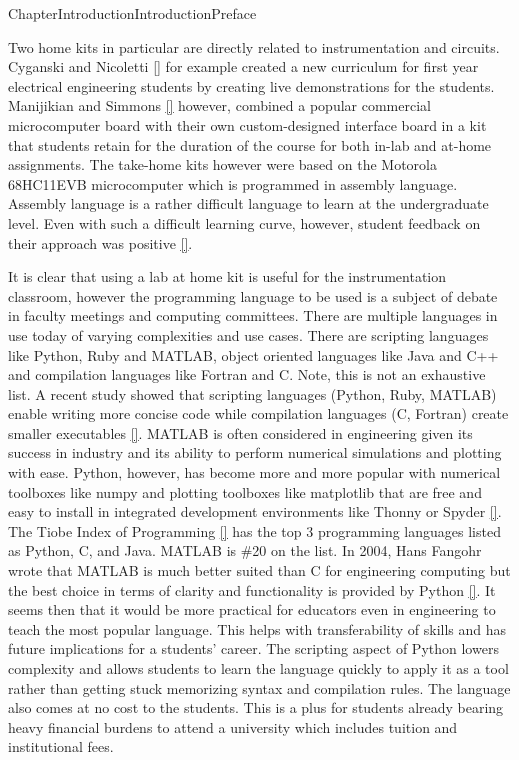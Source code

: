 \documentclass[oneside,10pt,]{book}
\newcommand{\xreffont}{\relax}
\newcommand{\linkhilite}[1]{\underline{#1}}
\numberwithin{equation}{section}
\begin{document}
\begin{chapterptx}{Chapter}{Introduction}{}{Introduction}{}{}{Preface}
\begin{introduction}{}
\par
Two home kits in particular are directly related to instrumentation and circuits. Cyganski and Nicoletti \hyperlink{LabAtHome4-EE}{\linkhilite{[{\xreffont 25}]}} for example created a new curriculum for first year electrical engineering students by creating live demonstrations for the students. Manijikian and Simmons \hyperlink{LabAtHome2-EE}{\linkhilite{[{\xreffont 23}]}} however, combined a popular commercial microcomputer board with their own custom-designed interface board in a kit that students retain for the duration of the course for both in-lab and at-home assignments. The take-home kits however were based on the Motorola 68HC11EVB microcomputer which is programmed in assembly language. Assembly language is a rather difficult language to learn at the undergraduate level. Even with such a difficult learning curve, however, student feedback on their approach was positive \hyperlink{LabAtHome2-EE}{\linkhilite{[{\xreffont 23}]}}.%
\par
It is clear that using a lab at home kit is useful for the instrumentation classroom, however the programming language to be used is a subject of debate in faculty meetings and computing committees. There are multiple languages in use today of varying complexities and use cases. There are scripting languages like Python, Ruby and MATLAB, object oriented languages like Java and C++ and compilation languages like Fortran and C. Note, this is not an exhaustive list. A recent study showed that scripting languages (Python, Ruby, MATLAB) enable writing more concise code while compilation languages (C, Fortran) create smaller executables \hyperlink{codetype}{\linkhilite{[{\xreffont 26}]}}. MATLAB is often considered in engineering given its success in industry and its ability to perform numerical simulations and plotting with ease. Python, however, has become more and more popular with numerical toolboxes like numpy and plotting toolboxes like matplotlib that are free and easy to install in integrated development environments like Thonny or Spyder \hyperlink{IDE}{\linkhilite{[{\xreffont 27}]}}. The Tiobe Index of Programming \hyperlink{Tiobe}{\linkhilite{[{\xreffont 28}]}} has the top 3 programming languages listed as Python, C, and Java. MATLAB is \#20 on the list. In 2004, Hans Fangohr wrote that MATLAB is much better suited than C for engineering computing but the best choice in terms of clarity and functionality is provided by Python \hyperlink{CodeComparison}{\linkhilite{[{\xreffont 29}]}}. It seems then that it would be more practical for educators even in engineering to teach the most popular language. This helps with transferability of skills and has future implications for a students' career. The scripting aspect of Python lowers complexity and allows students to learn the language quickly to apply it as a tool rather than getting stuck memorizing syntax and compilation rules. The language also comes at no cost to the students. This is a plus for students already bearing heavy financial burdens to attend a university which includes tuition and institutional fees.%

\end{introduction}
\end{chapterptx}
\end{document}
